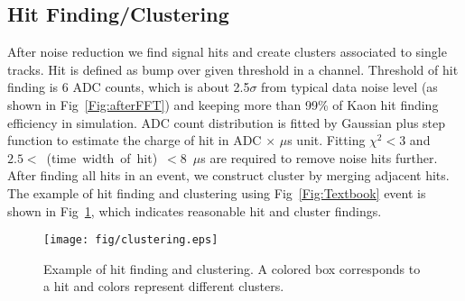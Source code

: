 \subsection{Hit Finding/Clustering}
After noise reduction we find signal hits and create clusters associated to single tracks. 
Hit is defined as bump over given threshold in a channel. 
Threshold of hit finding is 6 ADC counts, which is about 2.5$\sigma$ from typical data noise level (as shown in Fig~\ref{Fig:afterFFT}) and keeping more than 99\% of Kaon hit finding efficiency in simulation.
ADC count distribution is fitted by Gaussian plus step function to estimate the charge of hit in ADC $\times$ $\mu$s unit.
Fitting $\chi^2 < 3$ and $2.5<$~(time~width~of~hit)~$<8$~$\mu$s are required to remove noise hits further.
After finding all hits in an event, we construct cluster by merging adjacent hits. 
The example of hit finding and clustering using Fig~\ref{Fig:Textbook} event is shown in Fig~\ref{fig:Clustering}, which indicates reasonable hit and cluster findings. 

\begin{figure}[htbp]
 \begin{center}
  \texttt{[image: fig/clustering.eps]}
 \end{center}
 \caption{Example of hit finding and clustering. A colored box corresponds to a hit and colors represent different clusters.}
 \label{fig:Clustering}
\end{figure}

